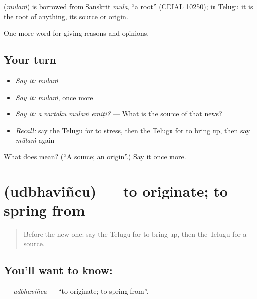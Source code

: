 \begin{cousinweb}
\textbf{} (\emph{mūlaṁ}) is borrowed from Sanskrit \emph{mūla}, \textquotedblleft{}a root\textquotedblright{} (CDIAL 10250); in Telugu it is the root of anything, its source or origin.
\end{cousinweb}

\begin{grammarlens}[title={What you've built}]
One more word for giving reasons and opinions.
\end{grammarlens}

\subsection*{Your turn}
\begin{itemize}
\raggedright
  \item \emph{Say it:} \emph{mūlaṁ}
  \item \emph{Say it:} \emph{mūlaṁ}, once more
  \item \emph{Say it:} \emph{ā vārtaku mūlaṁ ēmiṭi?} — What is the source of that news?
  \item \emph{Recall:} say the Telugu for to stress, then the Telugu for to bring up, then say \emph{mūlaṁ} again
\end{itemize}

\begin{tcolorbox}[breakable,colback=teal!4,colframe=teal!35!black,title={Before you move on}]
What does  mean? (\textquotedblleft{}A source; an origin\textquotedblright{}.) Say it once more.
\end{tcolorbox}
\section[\texorpdfstring{\te{ఉద్భవించు} (udbhaviñcu)}{ఉద్భవించు (udbhaviñcu)}]{ (udbhaviñcu) — to originate; to spring from}

\label{lesson:TE-C392-udbhavincu}



\begin{quote}
Before the new one: say the Telugu for to bring up, then the Telugu for a source.
\end{quote}

\subsection*{You'll want to know: }
\textbf{} — \emph{udbhaviñcu} — \textquotedblleft{}to originate; to spring from\textquotedblright{}.

